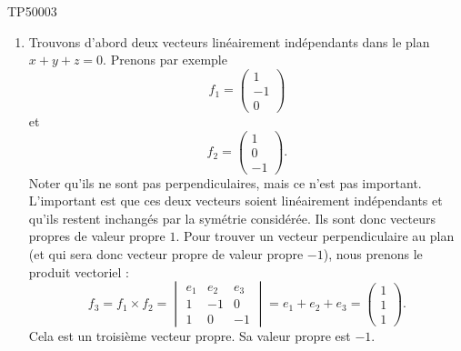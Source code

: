 \begin{corrige}{TP50003}
\begin{enumerate}
		\item
		      Trouvons d'abord deux vecteurs linéairement indépendants dans le plan $x+y+z=0$. Prenons par exemple
		      \begin{equation}
			      f_1=\begin{pmatrix}
				      1  \\
				      -1 \\
				      0
			      \end{pmatrix}
		      \end{equation}
		      et
		      \begin{equation}
			      f_2=\begin{pmatrix}
				      1 \\
				      0 \\
				      -1
			      \end{pmatrix}.
		      \end{equation}
		      Noter qu'ils ne sont pas perpendiculaires, mais ce n'est pas important. L'important est que ces deux vecteurs soient linéairement indépendants et qu'ils restent inchangés par la symétrie considérée. Ils sont donc vecteurs propres de valeur propre $1$.
		      Pour trouver un vecteur perpendiculaire au plan (et qui sera donc vecteur propre de valeur propre $-1$), nous prenons le produit vectoriel :
		      \begin{equation}
			      f_3=f_1\times f_2=\begin{vmatrix}
				      e_1 & e_2 & e_3 \\
				      1   & -1  & 0   \\
				      1   & 0   & -1
			      \end{vmatrix}=e_1+e_2+e_3=\begin{pmatrix}
				      1 \\
				      1 \\
				      1
			      \end{pmatrix}.
		      \end{equation}
		      Cela est un troisième vecteur propre. Sa valeur propre est $-1$.


\end{enumerate}
\end{corrige}

